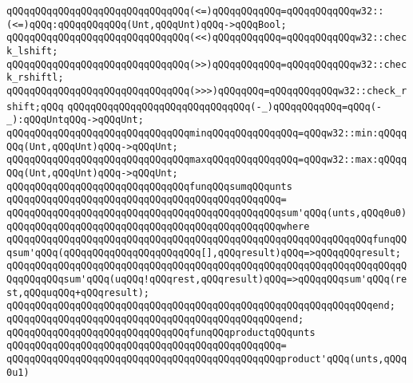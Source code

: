 \verb|qQQqqQQqqQQqqQQqqQQqqQQqqQQqqQQq(<=)qQQqqQQqqQQq=qQQqqQQqqQQqw32::(<=)qQQq:qQQqqQQqqQQq(Unt,qQQqUnt)qQQq->qQQqBool;|\newline
\newline
\verb|qQQqqQQqqQQqqQQqqQQqqQQqqQQqqQQq(<<)qQQqqQQqqQQq=qQQqqQQqqQQqw32::check_lshift;|\newline
\verb|qQQqqQQqqQQqqQQqqQQqqQQqqQQqqQQq(>>)qQQqqQQqqQQq=qQQqqQQqqQQqw32::check_rshiftl;|\newline
\verb|qQQqqQQqqQQqqQQqqQQqqQQqqQQqqQQq(>>>)qQQqqQQq=qQQqqQQqqQQqw32::check_rshift;qQQq|\newline
\newline
\verb|qQQqqQQqqQQqqQQqqQQqqQQqqQQqqQQq(-_)qQQqqQQqqQQq=qQQq(-_):qQQqUntqQQq->qQQqUnt;|\newline
\verb|qQQqqQQqqQQqqQQqqQQqqQQqqQQqqQQqminqQQqqQQqqQQqqQQq=qQQqw32::min:qQQqqQQq(Unt,qQQqUnt)qQQq->qQQqUnt;|\newline
\verb|qQQqqQQqqQQqqQQqqQQqqQQqqQQqqQQqmaxqQQqqQQqqQQqqQQq=qQQqw32::max:qQQqqQQq(Unt,qQQqUnt)qQQq->qQQqUnt;|\newline
\newline
\verb|qQQqqQQqqQQqqQQqqQQqqQQqqQQqqQQqfunqQQqsumqQQqunts|\newline
\verb|qQQqqQQqqQQqqQQqqQQqqQQqqQQqqQQqqQQqqQQqqQQqqQQq=|\newline
\verb|qQQqqQQqqQQqqQQqqQQqqQQqqQQqqQQqqQQqqQQqqQQqqQQqsum'qQQq(unts,qQQq0u0)|\newline
\verb|qQQqqQQqqQQqqQQqqQQqqQQqqQQqqQQqqQQqqQQqqQQqqQQqwhere|\newline
\verb|qQQqqQQqqQQqqQQqqQQqqQQqqQQqqQQqqQQqqQQqqQQqqQQqqQQqqQQqqQQqqQQqfunqQQqsum'qQQq(qQQqqQQqqQQqqQQqqQQqqQQq[],qQQqresult)qQQq=>qQQqqQQqresult;|\newline
\verb|qQQqqQQqqQQqqQQqqQQqqQQqqQQqqQQqqQQqqQQqqQQqqQQqqQQqqQQqqQQqqQQqqQQqqQQqqQQqqQQqsum'qQQq(uqQQq!qQQqrest,qQQqresult)qQQq=>qQQqqQQqsum'qQQq(rest,qQQquqQQq+qQQqresult);|\newline
\verb|qQQqqQQqqQQqqQQqqQQqqQQqqQQqqQQqqQQqqQQqqQQqqQQqqQQqqQQqqQQqqQQqend;|\newline
\verb|qQQqqQQqqQQqqQQqqQQqqQQqqQQqqQQqqQQqqQQqqQQqqQQqend;|\newline
\newline
\verb|qQQqqQQqqQQqqQQqqQQqqQQqqQQqqQQqfunqQQqproductqQQqunts|\newline
\verb|qQQqqQQqqQQqqQQqqQQqqQQqqQQqqQQqqQQqqQQqqQQqqQQq=|\newline
\verb|qQQqqQQqqQQqqQQqqQQqqQQqqQQqqQQqqQQqqQQqqQQqqQQqproduct'qQQq(unts,qQQq0u1)|\newline
